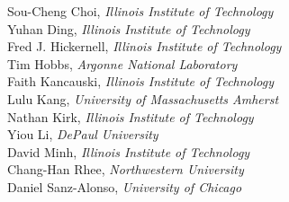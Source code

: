 Sou-Cheng Choi, \emph{Illinois Institute of Technology} \\
Yuhan Ding, \emph{Illinois Institute of Technology} \\
Fred J. Hickernell, \emph{Illinois Institute of Technology} \\
Tim Hobbs, \emph{Argonne National Laboratory} \\
Faith Kancauski, \emph{Illinois Institute of Technology} \\
Lulu Kang, \emph{University of Massachusetts Amherst} \\
Nathan Kirk, \emph{Illinois Institute of Technology} \\
Yiou Li, \emph{DePaul University} \\
David Minh, \emph{Illinois Institute of Technology} \\
Chang-Han Rhee, \emph{Northwestern University} \\
Daniel Sanz-Alonso, \emph{University of Chicago}